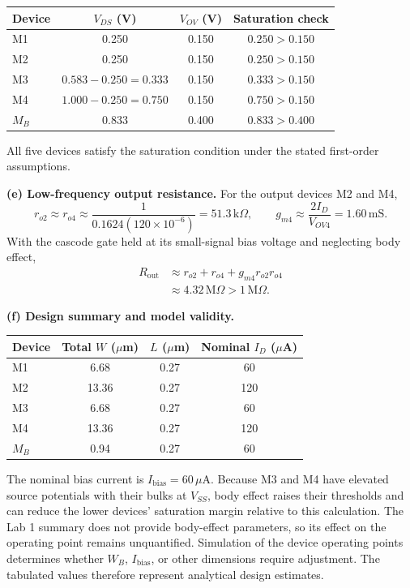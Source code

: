 \documentclass[12pt,letterpaper]{article}
\begin{document}
\begin{enumerate}
\begin{center}
\begin{tabular}{@{}lccc@{}}
\toprule
Device & $V_{DS}$ (V) & $V_{OV}$ (V) & Saturation check\\
\midrule
M1 & 0.250 & 0.150 & $0.250>0.150$\\
M2 & 0.250 & 0.150 & $0.250>0.150$\\
M3 & $0.583-0.250=0.333$ & 0.150 & $0.333>0.150$\\
M4 & $1.000-0.250=0.750$ & 0.150 & $0.750>0.150$\\
$M_B$ & 0.833 & 0.400 & $0.833>0.400$\\
\bottomrule
\end{tabular}
\end{center}
All five devices satisfy the saturation condition under the stated
first-order assumptions.

\textbf{(e) Low-frequency output resistance.}
For the output devices M2 and M4,
\[
r_{o2}\approx r_{o4}\approx\frac{1}{0.1624(120\times10^{-6})}
=51.3\,\mathrm{k}\Omega,
\qquad g_{m4}\approx\frac{2I_D}{V_{OV4}}=1.60\,\mathrm{mS}.
\]
With the cascode gate held at its small-signal bias voltage and
neglecting body effect,
\begin{align*}
R_{\mathrm{out}}&\approx r_{o2}+r_{o4}+g_{m4}r_{o2}r_{o4}\\
&\approx\boxed{4.32\,\mathrm{M}\Omega>1\,\mathrm{M}\Omega}.
\end{align*}

\textbf{(f) Design summary and model validity.}
\begin{center}
\begin{tabular}{@{}lccc@{}}
\toprule
Device & Total $W$ ($\mu$m) & $L$ ($\mu$m) & Nominal $I_D$ ($\mu$A)\\
\midrule
M1 & 6.68 & 0.27 & 60\\
M2 & 13.36 & 0.27 & 120\\
M3 & 6.68 & 0.27 & 60\\
M4 & 13.36 & 0.27 & 120\\
$M_B$ & 0.94 & 0.27 & 60\\
\bottomrule
\end{tabular}
\end{center}
The nominal bias current is $I_{\mathrm{bias}}=60\,\mu\mathrm{A}$.
Because M3 and M4 have elevated source potentials with their bulks
at $V_{SS}$, body effect raises their thresholds and can reduce the
lower devices' saturation margin relative to this calculation.
The Lab 1 summary does not provide body-effect parameters, so its
effect on the operating point remains unquantified. Simulation of
the device operating points determines whether $W_B$,
$I_{\mathrm{bias}}$, or other dimensions require adjustment. The
tabulated values therefore represent analytical design estimates.

\end{enumerate}
\end{document}
